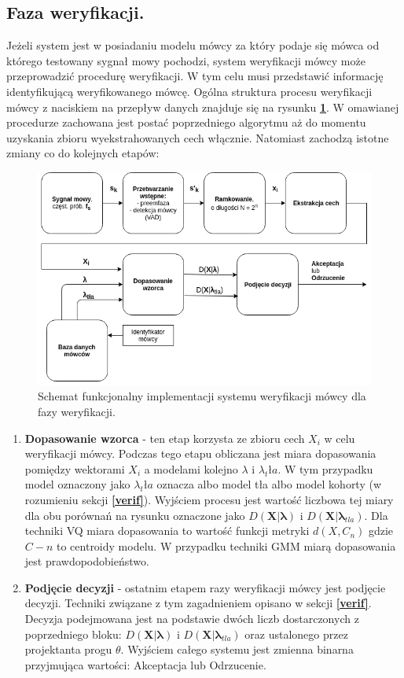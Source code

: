\subsection{Faza weryfikacji.}

Jeżeli system jest w posiadaniu modelu mówcy za który podaje się mówca od którego testowany sygnał mowy pochodzi, system weryfikacji mówcy może przeprowadzić procedurę weryfikacji. W tym celu musi przedstawić informację identyfikującą weryfikowanego mówcę. Ogólna struktura procesu weryfikacji mówcy z naciskiem na przepływ danych znajduje się na rysunku \textbf{\ref{fig:fundiagverif}}. W omawianej procedurze zachowana jest postać poprzedniego algorytmu aż do momentu uzyskania zbioru wyekstrahowanych cech włącznie. Natomiast zachodzą istotne zmiany co do kolejnych etapów:

\begin{figure}[ht!]
  \centering
    \includegraphics[width=1\textwidth]{./fundiagverif.png}
    \caption{\label{fig:fundiagverif} Schemat funkcjonalny implementacji systemu weryfikacji mówcy dla fazy weryfikacji.}
\end{figure}

\begin{enumerate}
\item{\textbf{Dopasowanie wzorca}} - ten etap korzysta ze zbioru cech $X_i$ w celu weryfikacji mówcy. Podczas tego etapu obliczana jest miara dopasowania pomiędzy wektorami $X_i$ a modelami kolejno $\lambda$ i $\lambda_tła$. W tym przypadku model oznaczony jako $\lambda_tła$ oznacza albo model tła albo model kohorty (w rozumieniu sekcji \textbf{\ref{verif}}). Wyjściem procesu jest wartość liczbowa tej miary dla obu porównań na rysunku oznaczone jako $D(\bm{X}|\bm{\lambda})$ i $D(\bm{X}|\bm{\lambda}_{tla})$. Dla techniki VQ miara dopasowania to wartość funkcji metryki $d(X,C_n)$ gdzie $C-n$ to centroidy modelu. W przypadku techniki GMM miarą dopasowania jest prawdopodobieństwo.
\item{\textbf{Podjęcie decyzji}} - ostatnim etapem razy weryfikacji mówcy jest podjęcie decyzji. Techniki związane z tym zagadnieniem opisano w sekcji \textbf{\ref{verif}}. Decyzja podejmowana jest na podstawie dwóch liczb dostarczonych z poprzedniego bloku: $D(\bm{X}|\bm{\lambda})$ i $D(\bm{X}|\bm{\lambda}_{tla})$ oraz ustalonego przez projektanta progu $\theta$. Wyjściem całego systemu jest zmienna binarna przyjmująca wartości: Akceptacja lub Odrzucenie.
\end{enumerate}


